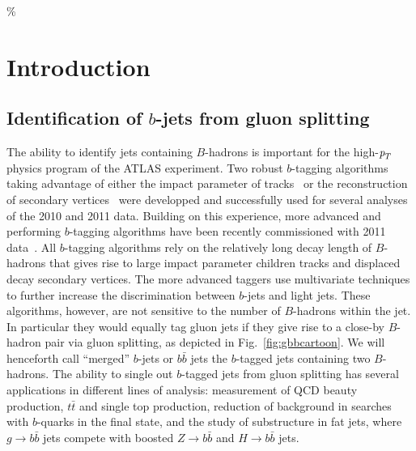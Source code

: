 \%
%
\chapter{Introduction}


\section{Identification of $b$-jets from gluon splitting}\label{sec:introduction}


The ability to identify jets containing $B$-hadrons is important for the high-${\emph{p}_{T}}$ physics program of the ATLAS experiment. Two robust $b$-tagging algorithms taking
advantage of either the impact parameter of tracks~\cite{ATLAS-CONF-2010-091} or the reconstruction of secondary vertices~\cite{ATLAS-CONF-2010-042} were developped and successfully used for several analyses of the 2010 and 2011 data. Building on this experience, more advanced and performing $b$-tagging algorithms have been recently commissioned with 2011 data~\cite{ATLAS-CONF-2011-102}.
All $b$-tagging algorithms rely on the relatively long decay length of $B$-hadrons that gives rise to large impact parameter children tracks and displaced decay secondary vertices. The more advanced taggers %
use multivariate techniques %
to further increase the discrimination between $b$-jets and light jets.
These algorithms, however, are not sensitive to the number of $B$-hadrons within the jet. In particular they would equally tag gluon jets if they give rise to a close-by $B$-hadron pair via gluon splitting, as depicted in Fig.~\ref{fig:gbbcartoon}. We will henceforth call ``merged'' $b$-jets or $b\bar{b}$ jets the $b$-tagged jets containing two $B$-hadrons. The ability to single out $b$-tagged jets from gluon splitting has several applications in different lines of analysis: measurement of QCD beauty production, $t\bar{t}$ and single top production, reduction of background in searches with $b$-quarks in the final state, and the study of substructure in fat jets, where $g\rightarrow b\bar{b}$ jets compete with boosted $Z\rightarrow b\bar{b}$ and $H\rightarrow b\bar{b}$ jets.
